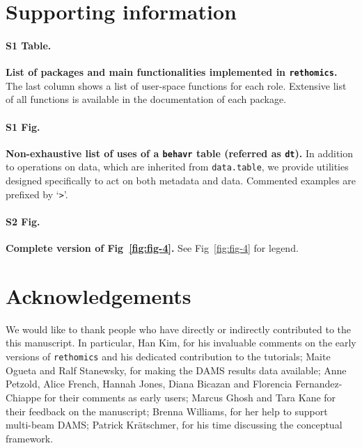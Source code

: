 \documentclass[10pt,letterpaper]{article}\usepackage[]{graphicx}\usepackage[]{color}
\begin{document}
\section*{Supporting information}



\paragraph*{S1 Table.}
\label{S1-Table}
{\bf List of packages and main functionalities implemented in \texttt{rethomics}.}
The last column shows a list of user-space functions for each role.
Extensive list of all functions is available in the documentation of each package.

\paragraph*{S1 Fig.}
\label{S1-Fig}
{\bf Non-exhaustive list of uses of a \texttt{behavr} table (referred as \texttt{dt}).}
In addition to operations on data, which are inherited from \texttt{data.table},
we provide utilities designed specifically to act on both metadata and data.  
Commented examples are prefixed by `\texttt{>}'.



\paragraph*{S2 Fig.}
\label{S2-Fig}
{\bf Complete version of Fig~\ref{fig:fig-4}.}
See Fig~\ref{fig:fig-4} for legend.


\section*{Acknowledgements}
We would like to thank people who have directly or indirectly contributed to the this manuscript.
In particular, Han Kim, for his invaluable comments on the early versions of \texttt{rethomics} and his dedicated contribution to the tutorials;
Maite Ogueta and Ralf Stanewsky, for making the DAMS results data available;
Anne Petzold, Alice French, Hannah Jones, Diana Bicazan and Florencia Fernandez-Chiappe for their comments as early users;
Marcus Ghosh and Tara Kane for their feedback on the manuscript;
Brenna Williams, for her help to support multi-beam DAMS;
Patrick Kr{\"a}tschmer, for his time discussing the conceptual framework.
\end{document}
